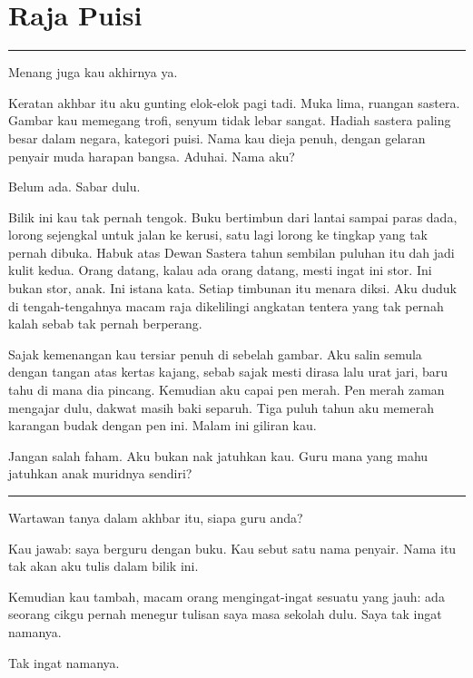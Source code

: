 \documentclass[
  11pt,
  a5paper,
  openany,
  oneside]{book}
\begin{document}
\chapter{Raja Puisi}\label{raja-puisi}

\begin{center}\rule{0.5\linewidth}{0.5pt}\end{center}

Menang juga kau akhirnya ya.

Keratan akhbar itu aku gunting elok-elok pagi tadi. Muka lima, ruangan
sastera. Gambar kau memegang trofi, senyum tidak lebar sangat. Hadiah
sastera paling besar dalam negara, kategori puisi. Nama kau dieja penuh,
dengan gelaran penyair muda harapan bangsa. Aduhai. Nama aku?

Belum ada. Sabar dulu.

Bilik ini kau tak pernah tengok. Buku bertimbun dari lantai sampai paras
dada, lorong sejengkal untuk jalan ke kerusi, satu lagi lorong ke
tingkap yang tak pernah dibuka. Habuk atas Dewan Sastera tahun sembilan
puluhan itu dah jadi kulit kedua. Orang datang, kalau ada orang datang,
mesti ingat ini stor. Ini bukan stor, anak. Ini istana kata. Setiap
timbunan itu menara diksi. Aku duduk di tengah-tengahnya macam raja
dikelilingi angkatan tentera yang tak pernah kalah sebab tak pernah
berperang.

Sajak kemenangan kau tersiar penuh di sebelah gambar. Aku salin semula
dengan tangan atas kertas kajang, sebab sajak mesti dirasa lalu urat
jari, baru tahu di mana dia pincang. Kemudian aku capai pen merah. Pen
merah zaman mengajar dulu, dakwat masih baki separuh. Tiga puluh tahun
aku memerah karangan budak dengan pen ini. Malam ini giliran kau.

Jangan salah faham. Aku bukan nak jatuhkan kau. Guru mana yang mahu
jatuhkan anak muridnya sendiri?

\begin{center}\rule{0.5\linewidth}{0.5pt}\end{center}

Wartawan tanya dalam akhbar itu, siapa guru anda?

Kau jawab: saya berguru dengan buku. Kau sebut satu nama penyair. Nama
itu tak akan aku tulis dalam bilik ini.

Kemudian kau tambah, macam orang mengingat-ingat sesuatu yang jauh: ada
seorang cikgu pernah menegur tulisan saya masa sekolah dulu. Saya tak
ingat namanya.

Tak ingat namanya.
\end{document}
